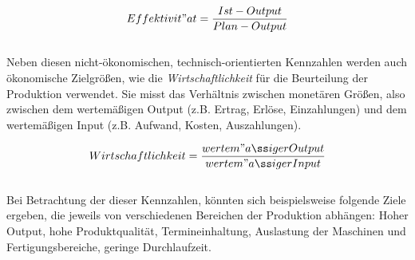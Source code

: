 \documentclass[a4paper,12pt, german]{report}
\begin{document}
\begin{equation}
 Effektivit"at =\frac{Ist-Output}{Plan-Output}
\end{equation}
$ $\\
Neben diesen nicht-ökonomischen, technisch-orientierten Kennzahlen werden auch ökonomische Zielgrößen, wie die \textit{Wirtschaftlichkeit} für die Beurteilung der Produktion verwendet. Sie misst das Verhältnis zwischen monetären Größen, also zwischen dem wertemäßigen Output (z.B. Ertrag, Erlöse, Einzahlungen) und dem wertemäßigen Input (z.B. Aufwand, Kosten, Auszahlungen). \cite{07}

\begin{equation}
  Wirtschaftlichkeit =\frac{wertem"aßiger Output}{wertem"aßiger Input}
\end{equation}
$ $\\
Bei Betrachtung der dieser Kennzahlen, könnten sich beispielsweise folgende Ziele ergeben, die jeweils von verschiedenen Bereichen der Produktion abhängen: Hoher Output, hohe Produktqualität, Termineinhaltung, Auslastung der Maschinen und Fertigungsbereiche, geringe Durchlaufzeit. 
\end{document}
